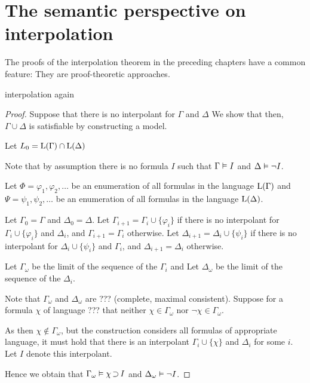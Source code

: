 
\chapter{The semantic perspective on interpolation}

The proofs of the interpolation theorem in the preceding chapters have a common feature:
They are proof-theoretic approaches.


\begin{thm}
	interpolation again
\end{thm}
\begin{proof}
	Suppose that there is no interpolant for $\Gamma$ and $\Delta$
	We show that then, $\Gamma\cup\Delta$ is satisfiable by constructing a model.

	Let $L_0 = \operatorname{L}(\Gamma) \cap \operatorname{L}(\Delta)$

	Note that by assumption there is no formula $I$ such that $\Gamma\vDash I$ and $\Delta \vDash \lnot I$.

	Let $\Phi = \varphi_1, \varphi_2, \dots$ be an enumeration of all formulas in the language $\operatorname{L}(\Gamma)$
	and
	$\Psi = \psi_1, \psi_2, \dots$ be an enumeration of all formulas in the language $\operatorname{L}(\Delta)$.

	Let $\Gamma_0 = \Gamma$
	and $\Delta_0 = \Delta$.
	Let $\Gamma_{i+1} = \Gamma_i \cup \{\varphi_i\}$ if there is no interpolant for $\Gamma_i \cup \{\varphi_i\}$ and $\Delta_i$, and $\Gamma_{i+1} = \Gamma_i$ otherwise.
	Let $\Delta_{i+1} = \Delta_i \cup \{\psi_i\}$ if there is no interpolant for $\Delta_i \cup \{\psi_i\}$ and $\Gamma_i$, and $\Delta_{i+1} = \Delta_i$ otherwise.

	Let $\Gamma_\omega$ be the limit of the sequence of the $\Gamma_i$ and
	Let $\Delta_\omega$ be the limit of the sequence of the $\Delta_i$.

	Note that $\Gamma_\omega$ and $\Delta_\omega$ are ??? (complete, maximal consistent).
	Suppose for a formula $\chi$ of language ??? that neither
	$\chi \in \Gamma_\omega$
	nor
	$\lnot\chi \in \Gamma_\omega$.

As then $\chi \not\in \Gamma_\omega$, but the construction considers all formulas of appropriate language, it must hold that there is an interpolant $\Gamma_i \cup \{\chi\}$ and $\Delta_i$ for some $i$.
Let $I$ denote this interpolant.

Hence we obtain that $\Gamma_\omega \vDash \chi \operatorname{\supset} I$ 
and $\Delta_\omega \vDash \lnot I$.


\end{proof}
